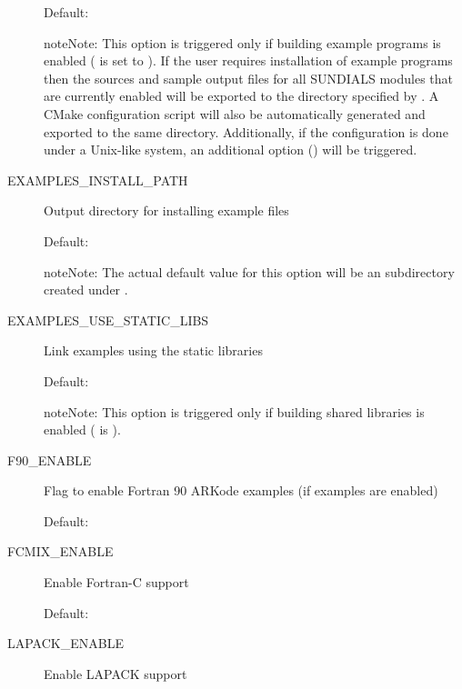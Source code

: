 \documentclass[letterpaper,10pt,english]{sphinxmanual}
\begin{document}
\begin{description}
Default: 

\begin{notice}{note}{Note:}
This option is triggered only if building example programs is
enabled ( is set to ). If the user
requires installation of example programs then the sources and
sample output files for all SUNDIALS modules that are currently
enabled will be exported to the directory specified by
. A CMake configuration script will also
be automatically generated and exported to the same
directory. Additionally, if the configuration is done under a
Unix-like system, an additional option
() will be triggered.
\end{notice}

\item[{\index{EXAMPLES\_INSTALL\_PATH (CMake option)}EXAMPLES\_INSTALL\_PATH}] \leavevmode
Output directory for installing example
files

Default: 

\begin{notice}{note}{Note:}
The actual default value for this option will be an
 subdirectory created under .
\end{notice}

\item[{\index{EXAMPLES\_USE\_STATIC\_LIBS (CMake option)}EXAMPLES\_USE\_STATIC\_LIBS}] \leavevmode
Link examples using the static libraries

Default: 

\begin{notice}{note}{Note:}
This option is triggered only if building shared libraries is
enabled ( is ).
\end{notice}

\item[{\index{F90\_ENABLE (CMake option)}F90\_ENABLE}] \leavevmode
Flag to enable Fortran 90 ARKode examples (if examples are enabled)

Default: 

\item[{\index{FCMIX\_ENABLE (CMake option)}FCMIX\_ENABLE}] \leavevmode
Enable Fortran-C support

Default: 

\item[{\index{LAPACK\_ENABLE (CMake option)}LAPACK\_ENABLE}] \leavevmode
Enable LAPACK support


\end{description}
\end{document}
